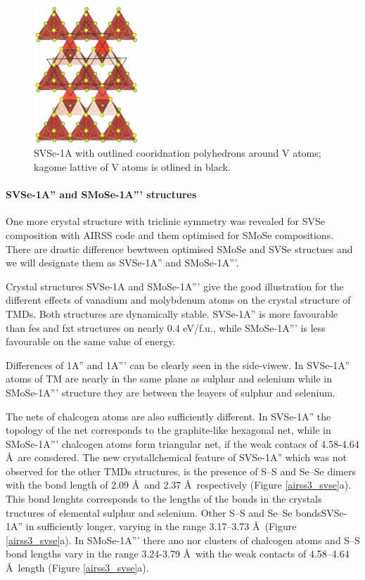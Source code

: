 \documentclass[a4paperm]{article}
\begin{document}
\begin{figure}[H]
        \includegraphics[width=0.35\textwidth]{airss1_v_poly.png}
        \caption{SVSe-1A with outlined cooridnation polyhedrons around V atoms; kagome lattive of V atoms is otlined in black.}
\label{airss1_poly}
\end{figure}




\paragraph{SVSe-1A'' and SMoSe-1A''' structures}
One more crystal structure with triclinic symmetry was revealed for SVSe composition with AIRSS code and them optimised for SMoSe compositions.
There are drastic difference bewtween optimised SMoSe and SVSe structues and we will designate them as SVSe-1A'' and SMoSe-1A'''.

Crystal structures  SVSe-1A and SMoSe-1A''' give the good illustration for the different effects of vanadium and molybdenum atoms on the crystal structure of TMDs.
Both structures are dynamically stable.
SVSe-1A'' is more favourable than fes and fxt structures on nearly 0.4 eV/f.u., while SMoSe-1A''' is less favourable on the same value of energy.

Differences of 1A'' and 1A''' can be clearly seen in the side-viwew.
In SVSe-1A'' atoms of TM are nearly in the same plane as sulphur and selenium while in SMoSe-1A''' structure they are between the leayers of sulphur and selenium.

The nets of chalcogen atoms are also sufficiently different.
In SVSe-1A'' the topology of the net corresponds to the graphite-like hexagonal net, while in SMoSe-1A''' chalcogen atoms form triangular net, if the weak contacs of 4.58-4.64 \AA\ are consdered.
The new crystallchemical feature of SVSe-1A'' which was not observed for the other TMDs structures, is the presence of S--S and Se--Se dimers with the bond length of 2.09 \AA\ and 2.37 \AA\, respectively (Figure \ref{airss3_svse}a).
This bond lenghts corresponds to the lengths of the bonds in the crystals tructures of elemental sulphur and selenium.
Other S--S and Se--Se bondsSVSe-1A'' in  sufficiently longer, varying in the range 3.17--3.73 \AA\ (Figure \ref{airss3_svse}a).
In SMoSe-1A''' there ano nor clusters of chalcogen atoms and S--S bond lengths vary in the range 3.24-3.79 \AA\ with the weak contacts of 4.58--4.64 \AA\ length (Figure \ref{airss3_svse}a).
\end{document}
